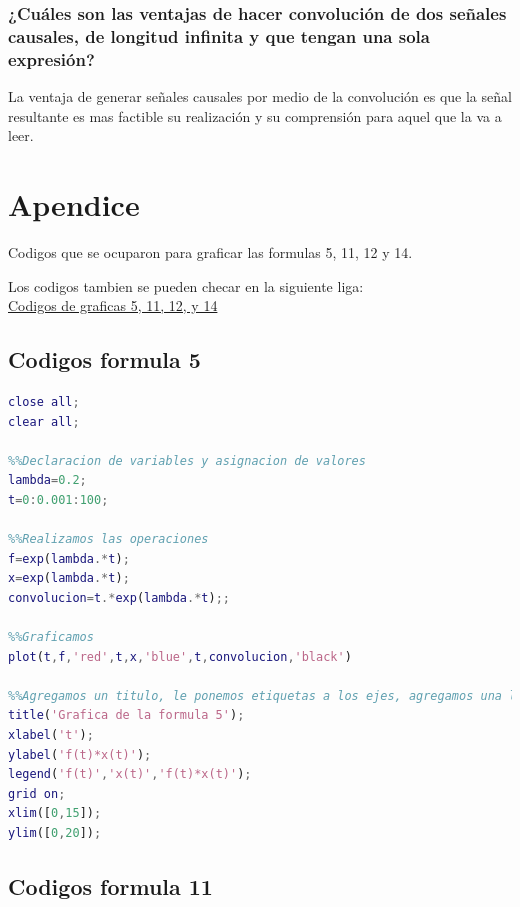\documentclass[10pt]{article}
\begin{document}
\subsubsection{¿Cuáles son las ventajas de hacer convolución de dos señales causales, de longitud infinita y que tengan una sola expresión?}

La ventaja de generar señales causales por medio de la convolución es que la señal resultante es mas factible su realización y su comprensión para aquel que la va a leer.  


\newpage
\section{Apendice}
Codigos que se ocuparon para graficar las formulas 5, 11, 12 y 14.

Los codigos tambien se pueden checar en la siguiente liga:\\
\href{https://octave-online.net/bucket~HNcktjiDzpR6CxYwKYz8Dz}{Codigos de graficas 5, 11, 12, y 14} \\

\subsection{Codigos formula 5}

\begin{lstlisting}[language=Matlab,label=grafica5,caption=Código para graficar la formula 5]
%%Cierra todas las ventanas y limpia las variables almacenadas
close all;
clear all;

%%Declaracion de variables y asignacion de valores
lambda=0.2;
t=0:0.001:100;

%%Realizamos las operaciones
f=exp(lambda.*t);
x=exp(lambda.*t);
convolucion=t.*exp(lambda.*t);;

%%Graficamos
plot(t,f,'red',t,x,'blue',t,convolucion,'black')

%%Agregamos un titulo, le ponemos etiquetas a los ejes, agregamos una leyenda a la grafica, le ponemos cuadricula y le asignamos limites a los ejes x e y 
title('Grafica de la formula 5');
xlabel('t');
ylabel('f(t)*x(t)');
legend('f(t)','x(t)','f(t)*x(t)');
grid on;
xlim([0,15]);
ylim([0,20]);
\end{lstlisting}


\newpage
\subsection{Codigos formula 11}
\end{document}

